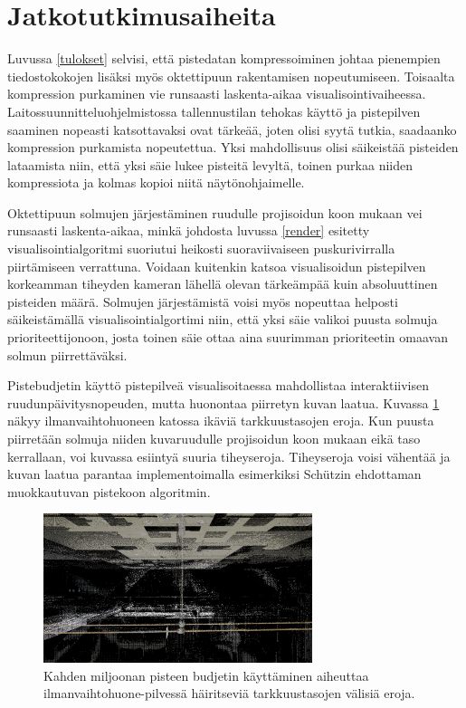 \section{Jatkotutkimusaiheita}

Luvussa \ref{tulokset} selvisi, että pistedatan kompressoiminen johtaa pienempien tiedostokokojen lisäksi myös oktettipuun rakentamisen nopeutumiseen. Toisaalta kompression purkaminen vie runsaasti laskenta-aikaa visualisointivaiheessa. Laitossuunnitteluohjelmistossa tallennustilan tehokas käyttö ja pistepilven saaminen nopeasti katsottavaksi ovat tärkeää, joten olisi syytä tutkia, saadaanko kompression purkamista nopeutettua. Yksi mahdollisuus olisi säikeistää pisteiden lataamista niin, että yksi säie lukee pisteitä levyltä, toinen purkaa niiden kompressiota ja kolmas kopioi niitä näytönohjaimelle.

Oktettipuun solmujen järjestäminen ruudulle projisoidun koon mukaan vei runsaasti laskenta-aikaa, minkä johdosta luvussa \ref{render} esitetty visualisointialgoritmi suoriutui heikosti suoraviivaiseen puskurivirralla piirtämiseen verrattuna. Voidaan kuitenkin katsoa visualisoidun pistepilven korkeamman tiheyden kameran lähellä olevan tärkeämpää kuin absoluuttinen pisteiden määrä. Solmujen järjestämistä voisi myös nopeuttaa helposti säikeistämällä visualisointialgortimi niin, että yksi säie valikoi puusta solmuja prioriteettijonoon, josta toinen säie ottaa aina suurimman prioriteetin omaavan solmun piirrettäväksi.

Pistebudjetin käyttö pistepilveä visualisoitaessa mahdollistaa interaktiivisen ruudunpäivitysnopeuden, mutta huonontaa piirretyn kuvan laatua. Kuvassa \ref{lod_border} näkyy ilmanvaihtohuoneen katossa ikäviä tarkkuustasojen eroja. Kun puusta piirretään solmuja niiden kuvaruudulle projisoidun koon mukaan eikä taso kerrallaan, voi kuvassa esiintyä suuria tiheyseroja. Tiheyseroja voisi vähentää ja kuvan laatua parantaa implementoimalla esimerkiksi Schützin \cite{potree} ehdottaman muokkautuvan pistekoon algoritmin. 

\begin{figure}
    \centering
    \includegraphics[width=0.7\textwidth]{tuloksia/ilmastointi_2M/ilmastointihuone_vesijohto_overviewbuf.png}
    \caption{Kahden miljoonan pisteen budjetin käyttäminen aiheuttaa ilmanvaihtohuone-pilvessä häiritseviä tarkkuustasojen välisiä eroja.}
    \label{lod_border}
\end{figure}

